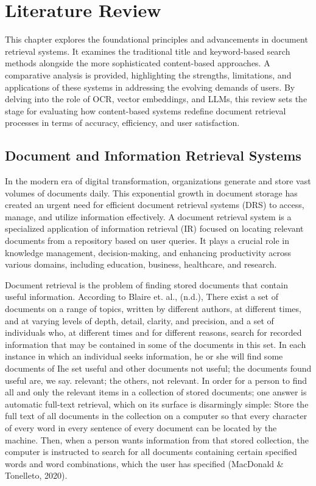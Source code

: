 \chapter{Literature Review}

\noindent This chapter explores the foundational principles and advancements in document retrieval systems. It examines the traditional title and keyword-based search methods alongside the more sophisticated content-based approaches. A comparative analysis is provided, highlighting the strengths, limitations, and applications of these systems in addressing the evolving demands of users. By delving into the role of OCR, vector embeddings, and LLMs, this review sets the stage for evaluating how content-based systems redefine document retrieval processes in terms of accuracy, efficiency, and user satisfaction.

\section{Document and Information Retrieval Systems}

\noindent In the modern era of digital transformation, organizations generate and store vast volumes of documents daily. This exponential growth in document storage has created an urgent need for efficient document retrieval systems (DRS) to access, manage, and utilize information effectively. A document retrieval system is a specialized application of information retrieval (IR) focused on locating relevant documents from a repository based on user queries. It plays a crucial role in knowledge management, decision-making, and enhancing productivity across various domains, including education, business, healthcare, and research.

Document retrieval is the problem of finding stored documents that contain useful information. According to Blaire et. al., (n.d.), There exist a set of documents on a range of topics, written by different authors, at different times, and at varying levels of depth, detail, clarity, and precision, and a set of individuals who, at different times and for different reasons, search for recorded information that may be contained in some of the documents in this set. In each instance in which an individual seeks information, he or she will find some documents of Ihe set useful and other documents not useful; the documents found useful are, we say. relevant; the others, not relevant. In order for a person to find all and only the relevant items in a collection of stored documents; one answer is automatic full-text retrieval, which on its surface is disarmingly simple: Store the full text of all documents in the collection on a computer so that every character of every word in every sentence of every document can be located by the machine. Then, when a person wants information from that stored collection, the computer is instructed to search for all documents containing certain specified words and word combinations, which the user has specified (MacDonald & Tonelleto, 2020).

